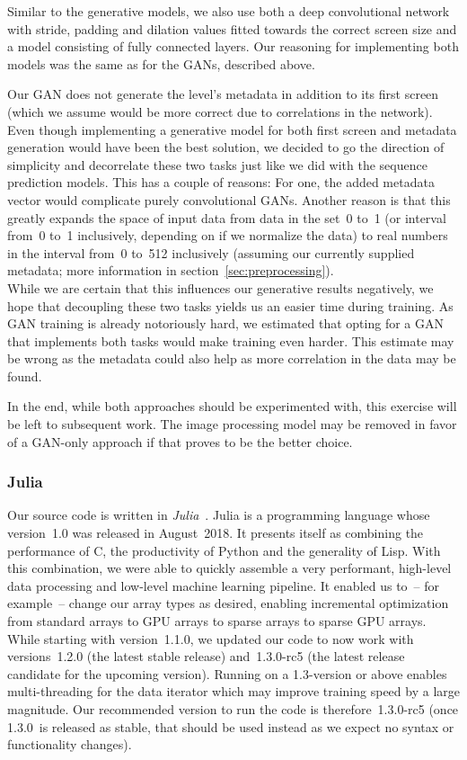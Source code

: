 Similar to the generative models, we also use both a deep
convolutional network with stride, padding and dilation values fitted
towards the correct screen size and a model consisting of fully
connected layers. Our reasoning for implementing both models was the
same as for the GANs, described above.

Our GAN does not generate the level's metadata in addition to its
first screen (which we assume would be more correct due to
correlations in the network). Even though implementing a generative
model for both first screen and metadata generation would have been
the best solution, we decided to go the direction of simplicity and
decorrelate these two tasks just like we did with the sequence
prediction models. This has a couple of reasons: For one, the added
metadata vector would complicate purely convolutional GANs. Another
reason is that this greatly expands the space of input data from data
in the set~0 to~1 (or interval from~0 to~1 inclusively, depending on
if we normalize the data) to real numbers in the interval from~0
to~512 inclusively (assuming our currently supplied metadata; more
information in section~\ref{sec:preprocessing}). \\
While we are certain that this influences our generative results
negatively, we hope that decoupling these two tasks yields us an
easier time during training. As GAN training is already notoriously
hard, we estimated that opting for a GAN that implements both tasks
would make training even harder. This estimate may be wrong as the
metadata could also help as more correlation in the data may be found.

In the end, while both approaches should be experimented with, this
exercise will be left to subsequent work. The image processing model
may be removed in favor of a GAN-only approach if that proves to be
the better choice.

\subsubsection{Julia}
\label{sec:julia}

Our source code is written in
\emph{Julia}~\cite{bezansonJuliaFreshApproach2017}. Julia is a
programming language whose version~1.0 was released in August~2018. It
presents itself as combining the performance of C, the productivity of
Python and the generality of Lisp. With this combination, we were able
to quickly assemble a very performant, high-level data processing and
low-level machine learning pipeline. It enabled us to~-- for example~--
change our array types as desired, enabling incremental optimization
from standard arrays to GPU arrays to sparse arrays to sparse GPU
arrays. While starting with version~1.1.0, we updated our code to now
work with versions~1.2.0 (the latest stable release)
and~\mbox{1.3.0-rc5} (the latest release candidate for the upcoming
version). Running on a 1.3-version or above enables multi-threading
for the data iterator which may improve training speed by a large
magnitude. Our recommended version to run the code is
therefore~\mbox{1.3.0-rc5} (once 1.3.0~is released as stable, that
should be used instead as we expect no syntax or functionality
changes).

